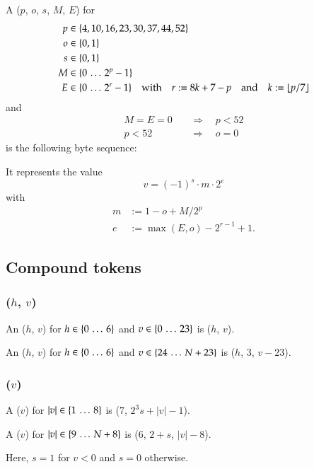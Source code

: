 A \DborBinaryRationalToken($p$, $o$, $s$, $M$, $E$) for
\begin{align*}
    p & \in \{4, 10, 16, 23, 30, 37, 44, 52\} \\
    o & \in \{0, 1\} \\
    s & \in \{0, 1\} \\
    M & \in \{0 \,\ldots\, 2^p - 1\} \\
    E & \in \{0 \,\ldots\, 2^r - 1\}
        \quad\text{with}\quad r := 8 k + 7 - p
        \quad\text{and}\quad k := \lfloor p / 7 \rfloor
\end{align*}%
and
\begin{align*}
    M = E = 0 \quad & \Rightarrow \quad p < 52 \\
    p < 52 \quad & \Rightarrow \quad o = 0
\end{align*}%
is the following byte sequence:


It represents the value
\begin{equation}
    v = (-1)^s \cdot m \cdot 2^e
\end{equation}
with
\begin{align*}
    m & := 1 - o + M / 2^p \\
    e & := \max(E, o) - 2^{r-1} + 1.
\end{align*}


\subsection{Compound tokens}

\subsubsection{\DborIntegerToken(\texorpdfstring{$h$, $v$}{h, v})}
\hypertarget{sec:def:IntegerToken}{}

An \DborIntegerToken($h$, $v$) for $h \in \{0 \,\ldots\, 6\}$ and
$v \in \{0 \,\ldots\, 23\}$ is \DborMinimalToken*($h$, $v$).

An \DborIntegerToken($h$, $v$) for $h \in \{0 \,\ldots\, 6\}$ and
$v \in \{24 \,\ldots\, N + 23\}$
is \DborNaturalToken*($h$, $3$, $v - 23$).


\subsubsection{\DborPowerOfTenToken(\texorpdfstring{$v$}{v})}
\hypertarget{sec:def:PowerOfTenToken}{}

A \DborPowerOfTenToken($v$) for $|v| \in \{1 \,\ldots\, 8\}$ is
\DborMinimalToken*($7$, $2^3 s + |v| - 1$).

A \DborPowerOfTenToken($v$) for $|v| \in \{9 \,\ldots\, N + 8\}$ is
\DborNaturalToken*($6$, $2 + s$, $|v| - 8$).

Here, $s = 1$ for $v < 0$ and $s = 0$ otherwise.
